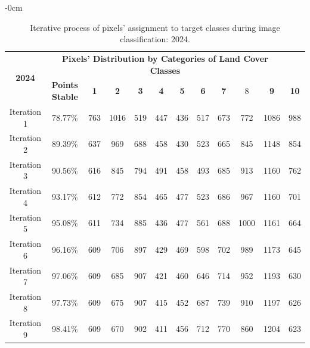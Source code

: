 \documentclass[jmse,article,accept,pdftex,oneauthor]{Definitions/mdpi}
\begin{document}
\begin{table}[H]
 \caption{Iterative process of pixels' assignment to target classes during image classification: 2024. \label{tabB4}}
 \setlength{\tabcolsep}{3.73mm}

\begin{adjustwidth}{-\extralength}{0cm}
   \begin{tabular}{cccccccccccc}
  \toprule
  \multirow{2}{*}{\textbf{2024}} & \multicolumn{10}{c}{\textbf{Pixels' Distribution by Categories of Land Cover Classes}} \\
    & \textbf{Points Stable} & \textbf{1} & \textbf{2} &  \textbf{3} & \textbf{4} & \textbf{5} & \textbf{6} & \textbf{7} & 8 & \textbf{9} & \textbf{10} \\
    \midrule
    Iteration 1 & 78.77\% & 763 &1016&519 &447 & 436 & 517 & 673 &772 & 1086 & 988 \\
    Iteration 2 & 89.39\% & 637 & 969 & 688 & 458 &430 &523 & 665 &845 &1148 & 854 \\
    Iteration 3 & 90.56\% & 616 & 845 & 794 & 491 &  458 & 493 & 685  & 913 & 1160 & 762 \\
    Iteration 4 & 93.17\% & 612 & 772 & 854 &465 &477 &523 & 686 &967 & 1160 &701 \\
    Iteration 5 & 95.08\% & 611 &  734 & 885 &  436 &  477 & 561 & 688 &  1000& 1161 &  664 \\
    Iteration 6 & 96.16\% & 609 &706 & 897 &429 &469 &598 &702 & 989 &1173 &645 \\
    Iteration 7 & 97.06\% & 609 & 685 & 907 &421& 460 & 646 &714 & 952 &1193 &630 \\
    Iteration 8 & 97.73\% & 609  &675  &907 &415 & 452  &687 &739  & 910  &1197  & 626 \\
    Iteration 9 & 98.41\% & 609& 670 & 902&411 &456 &712 & 770 & 860 &1204 &623 \\
\bottomrule
\end{tabular}
\end{adjustwidth}
 
  
\end{table}
\end{document}
